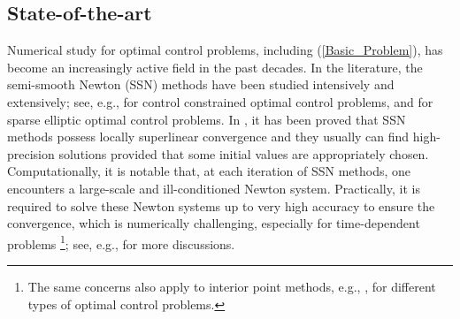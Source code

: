 \documentclass[final]{siamart171218}
\theoremstyle{remark}
\begin{document}
\subsection{State-of-the-art}
Numerical study for optimal control problems, including (\ref{Basic_Problem}), has become an increasingly active field in the past decades. In the literature, the semi-smooth Newton (SSN) methods have been studied intensively and extensively; see, e.g., \cite{hintermuller2002primal,hinze2008optimization,kroner2011,KR2002,ulbrich2011semismooth} for control constrained optimal control problems, and \cite{stadler2009elliptic} for sparse elliptic optimal control problems. In \cite{hintermuller2002primal}, it has been proved that SSN methods possess locally superlinear convergence and they usually can find high-precision solutions provided that some initial values are appropriately chosen. Computationally, it is notable that, at each iteration of SSN methods, one encounters a large-scale and ill-conditioned Newton system. Practically, it is required to solve these Newton systems up to very high accuracy to ensure the convergence, which is numerically challenging, especially for time-dependent problems \footnote{The same concerns also apply to interior point methods, e.g., \cite{pearson2017}, for different types of
optimal control problems.}; see, e.g., \cite {pearson2012regularization,porcelli2015preconditioning,schiela2014operator,stoll2013one} for more discussions.
\end{document}
